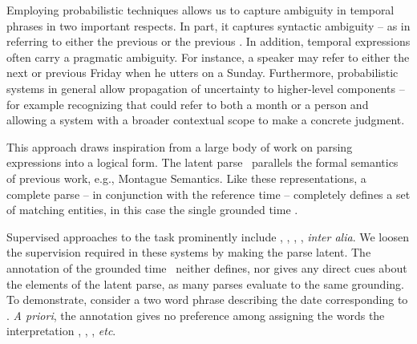 Employing probabilistic techniques allows us to capture ambiguity in temporal 
	phrases in two important respects.
In part, it captures syntactic ambiguity -- as in  referring to either the previous  or the previous
	.
In addition, temporal expressions often carry a pragmatic ambiguity.
For instance, a speaker may refer to either the next or previous Friday
	when he utters  on a Sunday.
Furthermore, probabilistic systems in general allow propagation of uncertainty
	to higher-level components -- for example recognizing that  could
	refer to both a month or a person and allowing a system with a broader
	contextual scope to make a concrete judgment.



This approach draws inspiration from a large body of work
	on parsing expressions into a logical form.
The latent parse \latent\ parallels the formal semantics of previous work,
	e.g., Montague Semantics.
Like these representations, a complete parse -- in conjunction with
	the reference time -- completely defines a set of
	matching entities, in this case the single grounded time \grounded.

Supervised approaches to the task prominently include
	,
	, 
	,
	, 
	\textit{inter alia}.
We loosen the supervision required in these systems by making the
	parse latent.
The annotation of the grounded time \grounded\ neither defines, nor gives any
	direct cues about the elements of the latent parse, as many parses evaluate
	to the same grounding.
To demonstrate, consider a two word phrase describing the date corresponding to
	.
\textit{A priori}, the annotation gives no preference among assigning the
	words the interpretation , ,
	\te{[month] [day]}, \textit{etc}.

